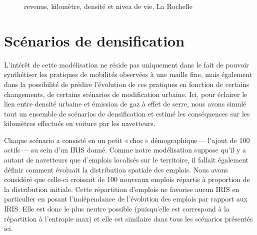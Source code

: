 \documentclass[
  9pt,
  a4paper,
  DIV=11]{scrreprt}
\begin{document}
\begin{figure}[htb]

\caption{\label{fig-prixkm}revenus, kilomètre, densité et nivea de vie,
La Rochelle}


\end{figure}%

\section{Scénarios de
densification}\label{scuxe9narios-de-densification}

L'intérêt de cette modélisation ne réside pas uniquement dans le fait de
pouvoir synthétiser les pratiques de mobilités observées à une maille
fine, mais également dans la possibilité de prédire l'évolution de ces
pratiques en fonction de certains changements, de certains scénarios de
modification urbaine. Ici, pour éclairer le lien entre densité urbaine
et émission de gaz à effet de serre, nous avons simulé tout un ensemble
de scénarios de densification et estimé les conséquences sur les
kilomètres effectués en voiture par les navetteurs.

Chaque scénario a consisté en un petit «\,choc\,» démographique\,---
l'ajout de 100 actifs\,--- au sein d'un IRIS donné. Comme notre
modélisation suppose qu'il y a autant de navetteurs que d'emplois
localisés sur le territoire, il fallait également définir comment
évoluait la distribution spatiale des emplois. Nous avons considéré que
celle-ci croissait de 100 nouveaux emplois répartis à proportion de la
distribution initiale. Cette répartition d'emplois ne favorise aucun
IRIS en particulier en posant l'indépendance de l'évolution des emplois
par rapport aux IRIS. Elle est donc le plus neutre possible (puisqu'elle
est correspond à la répartition à l'entropie max) et elle est similaire
dans tous les scénarios présentés ici.
\end{document}
